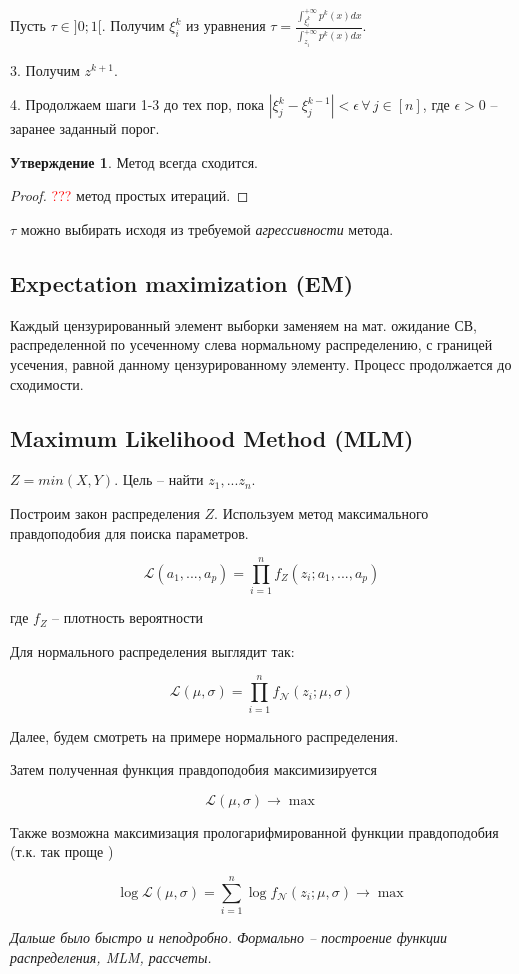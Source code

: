 \documentclass[reqno]{article}
\theoremstyle{definition}
\theoremstyle{definition}
\theoremstyle{definition}
\theoremstyle{definition}
\theoremstyle{definition}
\theoremstyle{definition}
\theoremstyle{definition}
\theoremstyle{definition}
\theoremstyle{definition}
\newtheorem{state}{Утверждение}[section]
\begin{document}
		Пусть $\tau \in ]0; 1[$. Получим $\xi_i^{k}$ из уравнения $\tau = \frac{\int_{\xi^{k}_i}^{+\infty} p^{k}(x) dx}{\int_{z_i}^{+\infty} p^{k}(x) dx}$.
		
		3. Получим $z^{k + 1}$.
		
		4. Продолжаем шаги 1-3 до тех пор, пока $|\xi^k_j - \xi^{k - 1}_j| < \epsilon \, \forall \, j \in [n]$, где $\epsilon > 0$ -- заранее заданный порог.
		
		\begin{state}
			Метод всегда сходится.
		\end{state}
		\begin{proof}
			\textcolor{red}{???} метод простых итераций.
		\end{proof}
		
		$\tau$ можно выбирать исходя из требуемой \textit{агрессивности} метода.
		
		\subsection{Expectation maximization (EM)}
		
		Каждый цензурированный элемент выборки заменяем на мат. ожидание СВ, распределенной по усеченному слева нормальному распределению, с границей усечения, равной данному цензурированному элементу. Процесс продолжается до сходимости.
		
		\subsection{Maximum Likelihood Method (MLM)}
		
		$Z = min(X, Y)$. Цель -- найти $z_1, ... z_n$.
		
		Построим закон распределения $Z$. Используем метод максимального правдоподобия для поиска параметров.
		
		$$\mathcal{L}(a_1, ..., a_p) = \prod^n_{i = 1} f_Z(z_i; a_1, ... , a_p)$$
			
		где $f_Z$ -- плотность вероятности
		
		Для нормального распределения выглядит так:
		
		$$\mathcal{L}(\mu, \sigma) = \prod^n_{i = 1} f_\mathcal{N}(z_i; \mu, \sigma)$$
		
		Далее, будем смотреть на примере нормального распределения.
		
		Затем полученная функция правдоподобия максимизируется
		
		$$\mathcal{L}(\mu, \sigma) \rightarrow \max$$
		
		Также возможна максимизация прологарифмированной функции правдоподобия (т.к. так проще )
		
		$$\log \mathcal{L}(\mu, \sigma) = \sum^n_{i = 1} \log f_\mathcal{N}(z_i; \mu, \sigma) \rightarrow \max$$
		
		\textit{Дальше было быстро и неподробно. Формально -- построение функции распределения, MLM, рассчеты.}
		
		
\end{document}
